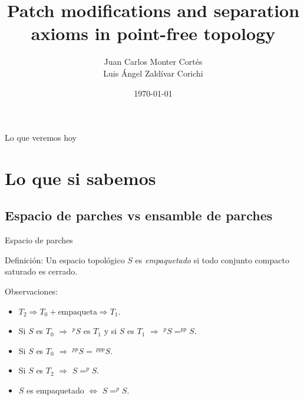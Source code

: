 \documentclass[compress,12pt]{beamer}
\title{Patch modifications and separation axioms in point-free topology}
\date{\today}
\author{Juan Carlos Monter Cortés\\ Luis Ángel Zaldívar Corichi}
\institute{Universidad de Guadalajara}
\begin{document}
\frame[plain]{\titlepage}

\begin{frame}{Lo que veremos hoy \smiley}
\tableofcontents %
\end{frame}

\section{Lo que si sabemos}
\subsection{Espacio de parches vs ensamble de parches}
\begin{frame}{Espacio de parches}
		
		\begin{block}{Definición:}
			Un espacio topológico $S$ es \emph{empaquetado} si todo conjunto compacto saturado es cerrado.
		\end{block}


   
		
\end{frame}

\begin{frame}
\begin{block}{Observaciones:}
\begin{itemize}
\item $T_2\Rightarrow T_0+\mbox{empaqueta}\Rightarrow T_1$.
\item<2-> Si $S$ es $T_0$ $\Rightarrow$ $^pS$ es $T_1$ y si $S$ es $T_1$ $\Rightarrow$ $^pS=^{pp}S$.
\item<3-> Si $S$ es $T_0$ $\Rightarrow$ $^{pp}S=\,^{ppp}S$.
\item<4-> Si $S$ es $T_2$ $\Rightarrow$ $S=^pS$.
\item<5-> $S$ es empaquetado $\Leftrightarrow$ $S=^pS$. 
\end{itemize}
\end{block}

\end{frame}
\end{document}
